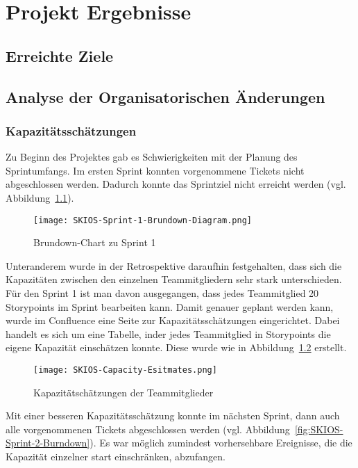 
\chapter{Projekt Ergebnisse}

\section{Erreichte Ziele}

\section{Analyse der Organisatorischen Änderungen}

\subsection{Kapazitätsschätzungen}

Zu Beginn des Projektes gab es Schwierigkeiten mit der Planung des Sprintumfangs. 
Im ersten Sprint konnten vorgenommene Tickets nicht abgeschlossen werden. 
Dadurch konnte das Sprintziel nicht erreicht werden (vgl. Abbildung~\ref{fig:SKIOS-Sprint-1-Brundown}).

\begin{figure}[h]
    \texttt{[image: SKIOS-Sprint-1-Brundown-Diagram.png]}
    \caption{Brundown-Chart zu Sprint 1}
    \label{fig:SKIOS-Sprint-1-Brundown}
\end{figure}

Unteranderem wurde in der Retrospektive daraufhin festgehalten, 
dass sich die Kapazitäten zwischen den einzelnen Teammitgliedern sehr stark unterschieden. 
Für den Sprint 1 ist man davon ausgegangen, dass jedes Teammitglied 20 Storypoints im Sprint bearbeiten kann.
Damit genauer geplant werden kann, wurde im Confluence eine Seite zur Kapazitätsschätzungen eingerichtet. 
Dabei handelt es sich um eine Tabelle, inder jedes Teammitglied in Storypoints die eigene Kapazität einschätzen konnte.
Diese wurde wie in Abbildung~\ref{fig:Capacitytable} erstellt. 

\begin{figure}[h]
    \texttt{[image: SKIOS-Capacity-Esitmates.png]}
    \caption{Kapazitätschätzungen der Teammitglieder}
    \label{fig:Capacitytable}
\end{figure}

Mit einer besseren Kapazitätsschätzung konnte im nächsten Sprint, dann auch alle vorgenommenen Tickets abgeschlossen werden (vgl. Abbildung~\ref{fig:SKIOS-Sprint-2-Burndown}).
Es war möglich zumindest vorhersehbare Ereignisse, die die Kapazität einzelner start einschränken, abzufangen.


